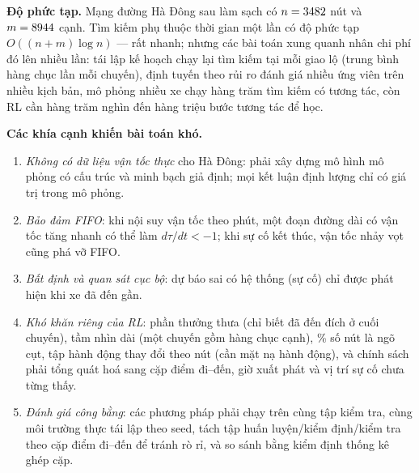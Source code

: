 \textbf{Độ phức tạp.} Mạng đường Hà Đông sau làm sạch có $n=3482$ nút và $m=8944$ cạnh. Tìm kiếm phụ thuộc thời
gian một lần có độ phức tạp $O((n+m)\log n)$ --- rất nhanh; nhưng các bài toán xung quanh nhân chi phí đó lên nhiều lần:
tái lập kế hoạch chạy lại tìm kiếm tại mỗi giao lộ (trung bình hàng chục lần mỗi chuyến), định tuyến theo rủi ro đánh
giá nhiều ứng viên trên nhiều kịch bản, mô phỏng nhiều xe chạy hàng trăm tìm kiếm có tương tác, còn RL cần hàng trăm
nghìn đến hàng triệu bước tương tác để học.

\textbf{Các khía cạnh khiến bài toán khó.}
\begin{enumerate}[label=(\arabic*)]
    \item \emph{Không có dữ liệu vận tốc thực} cho Hà Đông: phải xây dựng mô hình mô phỏng có cấu trúc và minh bạch giả
    định; mọi kết luận định lượng chỉ có giá trị trong mô phỏng.
    \item \emph{Bảo đảm FIFO}: khi nội suy vận tốc theo phút, một đoạn đường dài có vận tốc tăng nhanh có thể làm
    $d\tau/dt<-1$; khi sự cố kết thúc, vận tốc nhảy vọt cũng phá vỡ FIFO.
    \item \emph{Bất định và quan sát cục bộ}: dự báo sai có hệ thống (sự cố) chỉ được phát hiện khi xe đã đến gần.
    \item \emph{Khó khăn riêng của RL}: phần thưởng thưa (chỉ biết đã đến đích ở cuối chuyến), tầm nhìn dài (một chuyến
    gồm hàng chục cạnh), \DeadEndPct\% số nút là ngõ cụt, tập hành động thay đổi theo nút (cần mặt nạ hành động), và chính
    sách phải tổng quát hoá sang cặp điểm đi--đến, giờ xuất phát và vị trí sự cố chưa từng thấy.
    \item \emph{Đánh giá công bằng}: các phương pháp phải chạy trên cùng tập kiểm tra, cùng môi trường thực tái lập theo
    seed, tách tập huấn luyện/kiểm định/kiểm tra theo cặp điểm đi--đến để tránh rò rỉ, và so sánh bằng kiểm định thống kê
    ghép cặp.
\end{enumerate}
